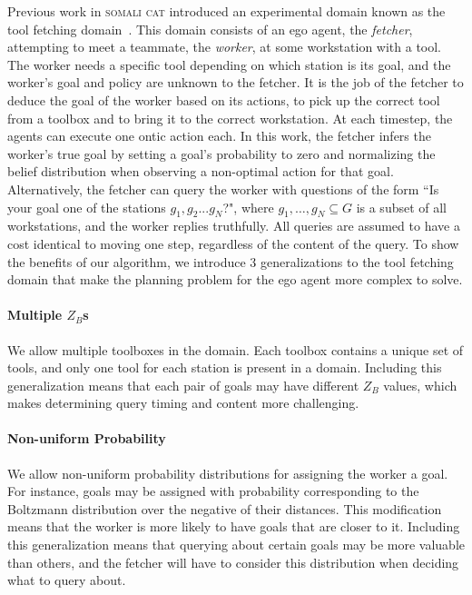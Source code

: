 \documentclass[letterpaper]{article}
\begin{document}
Previous work in \textsc{somali cat} introduced an experimental domain known as the tool fetching domain~\cite{mirskypenny}. This domain consists of an ego agent, the \emph{fetcher}, attempting to meet a teammate, the \emph{worker}, at some workstation with a tool. The worker needs a specific tool depending on which station is its goal, and the worker's goal and policy are unknown to the fetcher. It is the job of the fetcher to deduce the goal of the worker based on its actions, to pick up the correct tool from a toolbox and to bring it to the correct workstation. At each timestep, the agents can execute one ontic action each. In this work, the fetcher infers the worker's true goal by setting a goal's probability to zero and normalizing the belief distribution when observing a non-optimal action for that goal. Alternatively, the fetcher can query the worker with questions of the form ``Is your goal one of the stations $g_1,g_2...g_N$?", where $g_1, \ldots, g_N \subseteq G$ is a subset of all workstations, and the worker replies truthfully. All queries are assumed to have a cost identical to moving one step, regardless of the content of the query.
To show the benefits of our algorithm, we introduce 3 generalizations to the tool fetching domain that make the planning problem for the ego agent more complex to solve.
    \paragraph{Multiple $Z_B$s} We allow multiple toolboxes in the domain. Each toolbox contains a unique set of tools, and only one tool for each station is present in a domain. Including this generalization means that each pair of goals may have different $Z_B$ values, which makes determining query timing and content more challenging. %
    \paragraph{Non-uniform Probability} We allow non-uniform probability distributions for assigning the worker a goal. For instance, goals may be assigned with probability corresponding to the Boltzmann distribution over the negative of their distances. This modification means that the worker is more likely to have goals that are closer to it. Including this generalization means that querying about certain goals may be more valuable than others, and the fetcher will have to consider this distribution when deciding what to query about.
\end{document}
